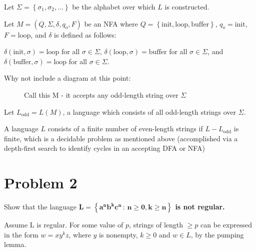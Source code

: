 \documentclass{report}
\begin{document}
Let $\Sigma = \left\{ \sigma_1, \sigma_2, \dots \right\}$ be the alphabet over which $L$ is constructed. 

Let $M = \left(Q, \Sigma, \delta, q_o, F \right)$  be an NFA
where $Q = \left\{ \text{init}, \text{loop}, \text{buffer} \right\}$, $q_o = \text{init}$, $F = \text{loop}$, and $\delta$ is defined as follows:

$\delta(\text{init}, \sigma) = \text{loop}$ for all $\sigma \in \Sigma$, $\delta(\text{loop}, \sigma) = \text{buffer}$ for all $\sigma \in \Sigma$,
and $\delta(\text{buffer}, \sigma) = \text{loop}$ for all $\sigma \in \Sigma$.

Why not include a diagram at this point:

\begin{figure}[H] %
        \centering %
        \caption*{Call this M - it accepts any odd-length string over $\Sigma$}
        \label{fig:p3}
    \end{figure}

Let $L_\text{odd} = L(M)$, a language which consists of all odd-length strings over $\Sigma$.

A language $L$ consists of a finite number of even-length strings if $L - L_\text{odd}$ is finite, which is a decidable problem as mentioned above (accomplished via a depth-first search to identify cycles in an accepting DFA or NFA)

 
\section*{Problem 2}

Show that the language
\textbf{$\mathbf{L = \left\{a^n b^k c^n \, : \, n \geq 0, k \geq n\right\}}$ is not regular.}

Assume L is regular. For some value of $p$, strings of length $\geq p$ can be expressed in the form $w = xy^kz$, where $y$ is nonempty, $k \geq 0$ and $w \in L$, by the pumping lemma.
\end{document}
